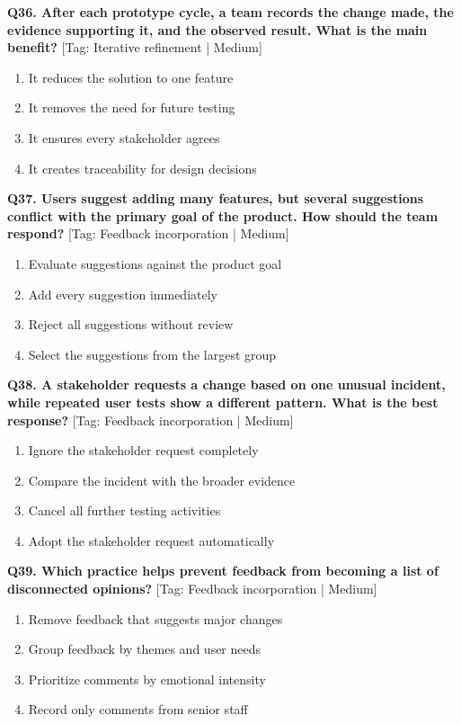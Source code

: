 \noindent\textbf{Q36. After each prototype cycle, a team records the change made, the evidence supporting it, and the observed result. What is the main benefit?} \hfill [Tag: Iterative refinement | Medium]
\begin{enumerate}[label=(\alph*),topsep=2pt,itemsep=1pt,partopsep=0pt,parsep=0pt]
    \item {It reduces the solution to one feature}
    \item {It removes the need for future testing}
    \item {It ensures every stakeholder agrees}
    \item {It creates traceability for design decisions}
\end{enumerate}
\vspace{2mm}

\noindent\textbf{Q37. Users suggest adding many features, but several suggestions conflict with the primary goal of the product. How should the team respond?} \hfill [Tag: Feedback incorporation | Medium]
\begin{enumerate}[label=(\alph*),topsep=2pt,itemsep=1pt,partopsep=0pt,parsep=0pt]
    \item {Evaluate suggestions against the product goal}
    \item {Add every suggestion immediately}
    \item {Reject all suggestions without review}
    \item {Select the suggestions from the largest group}
\end{enumerate}
\vspace{2mm}

\noindent\textbf{Q38. A stakeholder requests a change based on one unusual incident, while repeated user tests show a different pattern. What is the best response?} \hfill [Tag: Feedback incorporation | Medium]
\begin{enumerate}[label=(\alph*),topsep=2pt,itemsep=1pt,partopsep=0pt,parsep=0pt]
    \item {Ignore the stakeholder request completely}
    \item {Compare the incident with the broader evidence}
    \item {Cancel all further testing activities}
    \item {Adopt the stakeholder request automatically}
\end{enumerate}
\vspace{2mm}

\noindent\textbf{Q39. Which practice helps prevent feedback from becoming a list of disconnected opinions?} \hfill [Tag: Feedback incorporation | Medium]
\begin{enumerate}[label=(\alph*),topsep=2pt,itemsep=1pt,partopsep=0pt,parsep=0pt]
    \item {Remove feedback that suggests major changes}
    \item {Group feedback by themes and user needs}
    \item {Prioritize comments by emotional intensity}
    \item {Record only comments from senior staff}
\end{enumerate}
\vspace{2mm}

